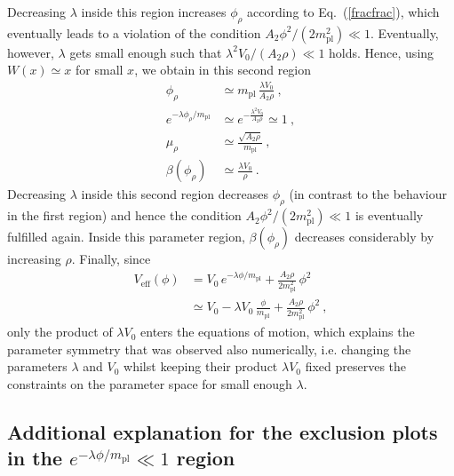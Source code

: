 \documentclass[aps,pra,twocolumn,floatfix,superscriptaddress,nofootinbib,showpacs,a4paper,balancelastpage,twoside]{revtex4-2}
\begin{document}
Decreasing $\lambda$ inside this region increases $\phi_\rho$ according to Eq.~(\ref{fracfrac}), which eventually leads to a violation of the condition  $A_2 \phi^2/(2 m_{\text{pl}}^2) \ll 1$. Eventually, however, $\lambda$ gets small enough such that $\lambda^2 V_0/(A_2 \rho) \ll 1$ holds. Hence, using $W(x) \simeq x$ for small $x$, we obtain in this second region
\begin{align}
    \phi_{\rho} &\simeq m_{\text{pl}}\,\frac{\lambda V_0}{A_2 \rho}\>, \\
    e^{-\lambda \phi_\rho / m_{\text{pl}}} &\simeq e^{-\frac{\lambda^2 V_0}{A_2 \rho}} \simeq 1\>, \\
    \mu_{\rho} &\simeq \frac{\sqrt{A_2 \rho}}{m_{\text{pl}}}\>,\\
    \beta(\phi_{\rho}) &\simeq \frac{\lambda V_0}{\rho}\>.
\end{align}
Decreasing $\lambda$ inside this second region decreases $\phi_\rho$ (in contrast to the behaviour in the first region) and hence the condition $A_2 \phi^2/(2 m_{\text{pl}}^2) \ll 1$ is eventually fulfilled again. Inside this parameter region, $\beta(\phi_{\rho})$ decreases considerably by increasing $\rho$. Finally, since 
\begin{align}
    V_{\text{eff}}(\phi) &= V_0\, e^{- \lambda \phi /m_{\text{pl}}} + \frac{A_2\rho}{2 m_{\text{pl}}^2}\, \phi^2 \nonumber\\
    &\simeq V_0 - \lambda V_0\, \frac{\phi}{m_{\text{pl}}} + \frac{A_2\rho}{2 m_{\text{pl}}^2}\, \phi^2\>,
\end{align}
only the product of $\lambda V_0 $ enters the equations of motion, which explains the parameter symmetry that was observed also numerically, i.e. changing the parameters $\lambda$ and  $V_0$ whilst keeping their product $\lambda V_0$ fixed preserves the constraints on the parameter space for small enough $\lambda$.


\subsection{Additional explanation for the exclusion plots in the $e^{-\lambda \phi / m_{\text{pl}}} \ll 1 $ region}\label{AppSM2}
\end{document}
